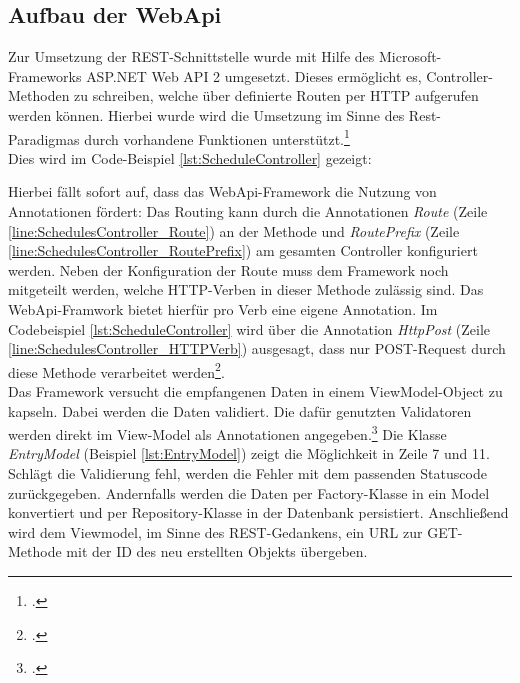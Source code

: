\subsection{Aufbau der WebApi}
\label{ssec:aufbau-webapi}
Zur Umsetzung der REST-Schnittstelle wurde mit Hilfe des Microsoft-Frameworks \ac{ASP.NET Web API 2} umgesetzt. Dieses ermöglicht es, Controller-Methoden zu schreiben, welche über definierte Routen per HTTP aufgerufen werden können. Hierbei wurde wird die Umsetzung im Sinne des Rest-Paradigmas durch vorhandene Funktionen unterstützt.\footcite[S. 2ff.]{Building-a-REST-Service}\\
Dies wird im Code-Beispiel \ref{lst:ScheduleController} gezeigt:

Hierbei fällt sofort auf, dass das WebApi-Framework die Nutzung von Annotationen fördert: Das Routing kann durch die Annotationen \textit{Route} (Zeile \ref{line:SchedulesController_Route}) an der Methode und \textit{RoutePrefix} (Zeile \ref{line:SchedulesController_RoutePrefix}) am gesamten Controller konfiguriert werden. Neben der Konfiguration der Route muss dem Framework noch mitgeteilt werden, welche HTTP-Verben in dieser Methode zulässig sind. Das WebApi-Framwork bietet hierfür pro Verb eine eigene Annotation. Im Codebeispiel \ref{lst:ScheduleController} wird über die Annotation \textit{HttpPost} (Zeile \ref{line:SchedulesController_HTTPVerb}) ausgesagt, dass nur POST-Request durch diese Methode verarbeitet werden\footcite{webApi-AttributeRouting}. \\
Das Framework versucht die empfangenen Daten in einem ViewModel-Object zu kapseln. Dabei werden die Daten validiert. Die dafür genutzten Validatoren werden direkt im View-Model als Annotationen angegeben.\footcite{webApi-Validation} Die Klasse \textit{EntryModel} (Beispiel \ref{lst:EntryModel}) zeigt die Möglichkeit in Zeile 7 und 11. \\ 
Schlägt die Validierung fehl, werden die Fehler mit dem passenden Statuscode zurückgegeben. Andernfalls werden die Daten per \ac{Factory}-Klasse in ein Model konvertiert und per \ac{Repository}-Klasse in der Datenbank persistiert. Anschließend wird dem Viewmodel, im Sinne des REST-Gedankens, ein URL zur GET-Methode mit der ID des neu erstellten Objekts übergeben. 

